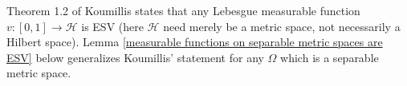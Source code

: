 \documentclass{article}
\numberwithin{theorem}{section}
\numberwithin{lemma}{section}
\numberwithin{definition}{section}
\numberwithin{assumption}{section}
\numberwithin{proposition}{section}
\numberwithin{remark}{section}
\numberwithin{corollary}{section}
\numberwithin{conjecture}{section}
\newtheorem{example}{Example}
\numberwithin{example}{section}
\newcommand{\R}{\mathbb{R}}
\newcommand{\bset}[1]{\left \lbrace #1 \right \rbrace}
\newcommand{\Span}[1]{\mathrm{Span}\bset{#1}}
\begin{document}
\begin{multicols*}{2}

Theorem 1.2 of Koumillis \cite{koumoullis1981on}  states that any Lebesgue measurable function $v:[0,1] \to \mathcal H$ is ESV (here $\mathcal H$ need merely be a metric space, not necessarily a Hilbert space). %
Lemma \ref{measurable functions on separable metric spaces are ESV} below generalizes Koumillis' statement for any $\Omega$ which is a separable metric space. 

\end{multicols*}
\end{document}
